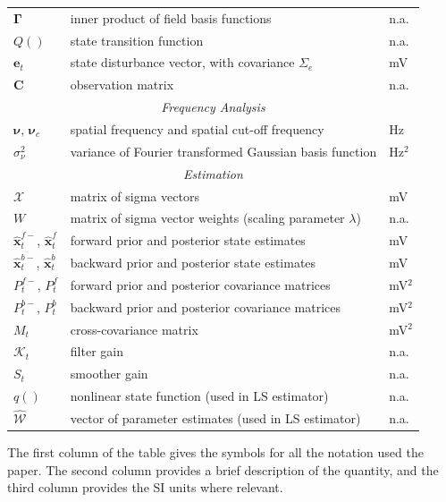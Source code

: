 \documentclass[10pt]{article}
\begin{document}
\begin{table}[!ht]
\begin{tabular}{|l|l|l|}
   	$\boldsymbol{\Gamma}$ & inner product of field basis functions & n.a.\\
   	$Q()$ & state transition function & n.a.\\
   	$\mathbf{e}_t$ & state disturbance vector, with covariance $\Sigma_e$ & mV\\
   	$\mathbf{C}$ & observation matrix & n.a. \\
	\hline
	\multicolumn{3}{|c|}{\emph{Frequency Analysis}} \\
	\hline
	$\boldsymbol{\nu}$, $\boldsymbol{\nu}_c$ & spatial frequency and spatial cut-off frequency & Hz \\
	$\sigma_{\nu}^2$ & variance of Fourier transformed Gaussian basis function & Hz$^2$\\
	\hline
	\multicolumn{3}{|c|}{\emph{Estimation}} \\
	\hline
	$\mathcal{X}$ & matrix of sigma vectors & mV\\
	$W$ & matrix of sigma vector weights (scaling parameter $\lambda$) & n.a.\\
   	$\hat{\mathbf{x}}_t^{f-}$, $\hat{\mathbf{x}}_t^f$ & forward prior and posterior state estimates & mV\\
   	$\hat{\mathbf{x}}_t^{b-}$, $\hat{\mathbf{x}}_t^{b}$ & backward prior and posterior state estimates & mV\\
 	$P^{f-}_t$, $P^f_t$  & forward prior and posterior covariance matrices & mV$^2$\\
   	$P^{b-}_t$, $P^b_t$ & backward prior and posterior covariance matrices & mV$^2$\\
	$M_t$& cross-covariance matrix & mV$^2$\\
	$\mathcal K_{t} $ & filter gain & n.a.\\
	$S_t$ & smoother gain & n.a.\\
	$q()$ & nonlinear state function (used in LS estimator) & n.a.\\
   	$\mathcal{\hat{W}}$& vector of parameter estimates (used in LS estimator) & n.a.\\	
	\hline
\end{tabular}
\begin{flushleft}The first column of the table gives the symbols for all the notation used the paper. The second column provides a brief description of the quantity, and the third column provides the SI units where relevant.
\end{flushleft}
\label{tab:Notation}
\end{table}
\end{document}
